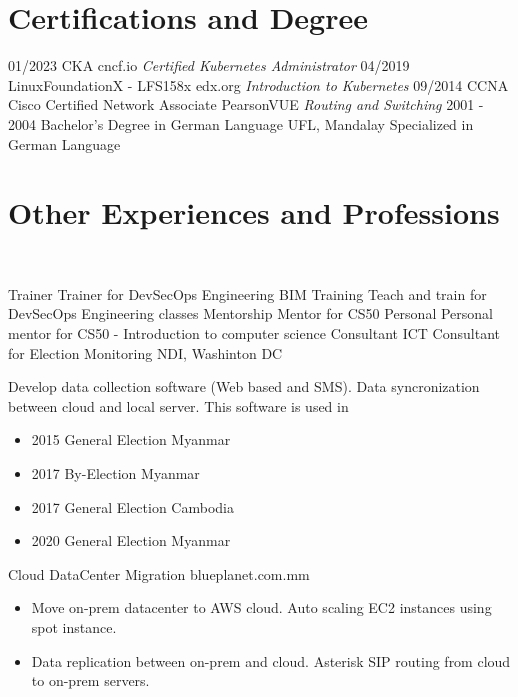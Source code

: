 \documentclass[]{friggeri-cv}
\begin{document}
\section{Certifications and Degree}
\begin{entrylist}
  \entry
  {01/2023}
  {CKA}
  {cncf.io}
  {\emph{Certified Kubernetes Administrator}}
  \entry
  {04/2019}
  {LinuxFoundationX - LFS158x}
  {edx.org}
  {\emph{Introduction to Kubernetes}}
  \entry
  {09/2014}
  {CCNA Cisco Certified Network Associate}
  {PearsonVUE}
  {\emph{Routing and Switching}}
  \entry
  {2001 - 2004}
  {Bachelor's Degree in German Language}
  {UFL, Mandalay}
  {Specialized in German Language\\ }
  
\end{entrylist}

\section{Other Experiences and Professions}
~
\begin{entrylist}
  \entry
  {Trainer}
  {Trainer for DevSecOps Engineering}
  {BIM Training}
  {Teach and train for DevSecOps Engineering classes}
  \entry
  {Mentorship}
  {Mentor for CS50}
  {Personal}
  {Personal mentor for CS50 - Introduction to computer science}
  \entry
  {Consultant}
  {ICT Consultant for Election Monitoring}
  {NDI, Washinton DC}
  {Develop data collection software (Web based and SMS). Data syncronization between cloud and local server. This software is used in 
    \begin{itemize}
      \item 2015 General Election Myanmar
      \item 2017 By-Election Myanmar
      \item 2017 General Election Cambodia
      \item 2020 General Election Myanmar
    \end{itemize}}
  \entry
  {Cloud}
  {DataCenter Migration}
  {blueplanet.com.mm}
  {
    \begin{itemize}
      \item Move on-prem datacenter to AWS cloud. Auto scaling EC2 instances using spot instance. 
      \item Data replication between on-prem and cloud. Asterisk SIP routing from cloud to on-prem servers.
    \end{itemize}}
\end{entrylist}
\end{document}
